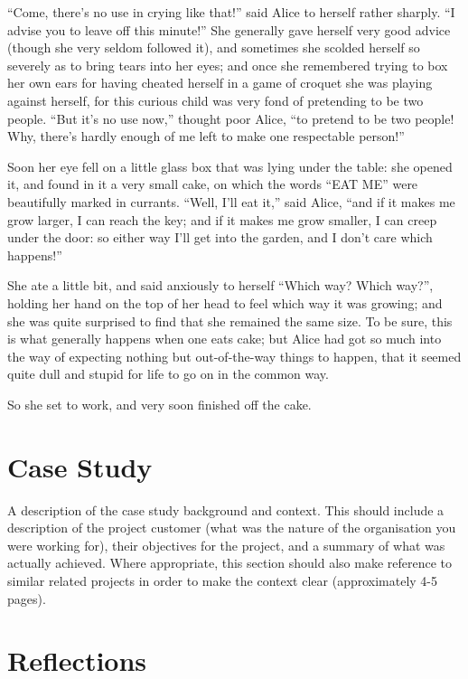 \documentclass{l3proj}
\begin{document}
``Come, there's no use in crying like that!'' said Alice to herself rather
sharply. ``I advise you to leave off this minute!'' She generally gave
herself very good advice (though she very seldom followed it), and
sometimes she scolded herself so severely as to bring tears into her eyes;
and once she remembered trying to box her own ears for having cheated
herself in a game of croquet she was playing against herself, for this
curious child was very fond of pretending to be two people. ``But it's no
use now,'' thought poor Alice, ``to pretend to be two people! Why, there's
hardly enough of me left to make one respectable person!''

Soon her eye fell on a little glass box that was lying under the table: she
opened it, and found in it a very small cake, on which the words ``EAT ME''
were beautifully marked in currants. ``Well, I'll eat it,'' said Alice, ``and
if it makes me grow larger, I can reach the key; and if it makes me grow
smaller, I can creep under the door: so either way I'll get into the
garden, and I don't care which happens!''

She ate a little bit, and said anxiously to herself ``Which way? Which
way?'', holding her hand on the top of her head to feel which way it was
growing; and she was quite surprised to find that she remained the same
size. To be sure, this is what generally happens when one eats cake; but
Alice had got so much into the way of expecting nothing but out-of-the-way
things to happen, that it seemed quite dull and stupid for life to go on in
the common way.

So she set to work, and very soon finished off the cake. 

\chapter{Case Study}
\label{case}

A description of the case study background and context. This should include a description of the project customer (what was the nature of the organisation you were working for), their objectives for the project, and a summary of what was actually achieved. Where appropriate, this section should also make reference to similar related projects in order to make the context clear (approximately 4-5 pages).

\chapter{Reflections}
\end{document}
